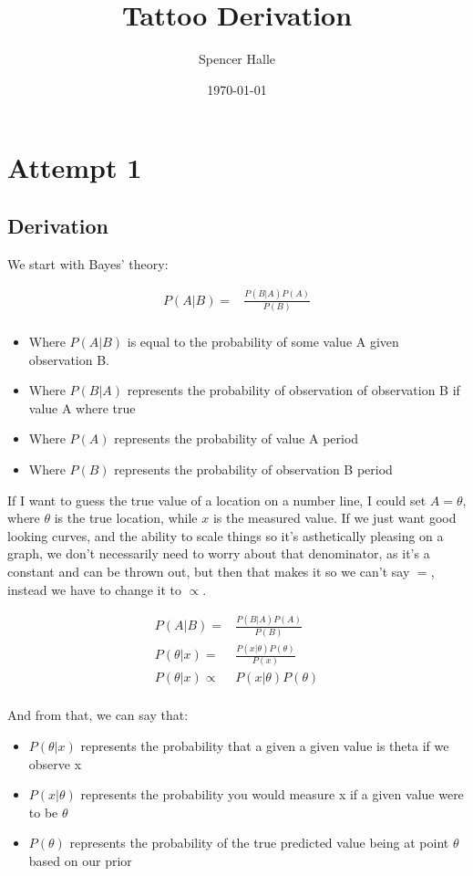 \documentclass{article}
\title{Tattoo Derivation}
\author{Spencer Halle}
\date{\today}
\begin{document}
\maketitle
\newpage

\chapter{Attempt 1}

\section{Derivation}
We start with Bayes' theory:

\begin{align*}
   P(A|B) =& \frac{P(B|A) P(A)}{P(B)}\\ 
\end{align*}

\begin{itemize}
    \item Where $P(A|B)$ is equal to the probability of some value A given observation B.
    \item Where $P(B|A)$ represents the probability of observation of observation B if value A where true
    \item Where $P(A)$ represents the probability of value A period
    \item Where $P(B)$ represents the probability of observation B period
\end{itemize}

If I want to guess the true value of a location on a number line, I could set $A=\theta$, where $\theta$ is the true location, while $x$ is the measured value. If we just want good looking curves, and the ability to scale things so it's asthetically pleasing on a graph, we don't necessarily need to worry about that denominator, as it's a constant and can be thrown out, but then that makes it so we can't say $=$, instead we have to change it to $\propto$.

\begin{align*}
   P(A|B) =& \frac{P(B|A) P(A)}{P(B)}\\ 
   P(\theta|x) =& \frac{P(x|\theta) P(\theta)}{P(x)}\\ 
   P(\theta|x) \propto& P(x|\theta) P(\theta)\\
\end{align*}

And from that, we can say that:
\begin{itemize}
    \item $P(\theta|x)$ represents the probability that a given a given value is theta if we observe x
    \item $P(x|\theta)$ represents the probability you would measure x if a given value were to be $\theta$
    \item $P(\theta)$ represents the probability of the true predicted value being at point $\theta$ based on our prior
\end{itemize}
\end{document}
